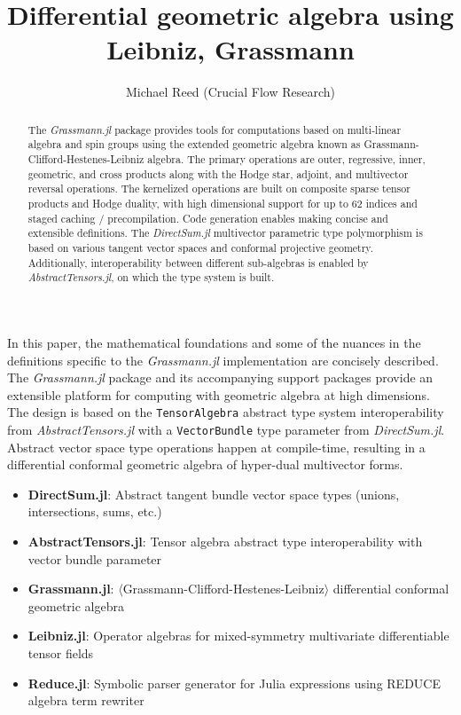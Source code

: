 \documentclass[]{article}
\author{Michael Reed (Crucial Flow Research)}
\title{Differential geometric algebra using Leibniz, Grassmann}
\begin{document}
%

\maketitle

\begin{abstract}
	The \textit{Grassmann.jl}
	package provides tools for computations based on multi-linear algebra and spin groups using the extended geometric algebra known as Grassmann-Clifford-Hestenes-Leibniz algebra.
	The primary operations are
	outer, regressive, inner, geometric, and cross products along with the Hodge star, adjoint, and multivector reversal operations. 
	The kernelized operations are built on composite sparse tensor products and Hodge duality, with high dimensional support for up to 62 indices and staged caching / precompilation. Code generation enables making concise and extensible definitions.
	The \textit{DirectSum.jl}
	multivector parametric type polymorphism is based on various tangent vector spaces and conformal projective geometry.
	Additionally, interoperability between different sub-algebras is enabled by \textit{AbstractTensors.jl},
	on which the type system is built.
\end{abstract}

In this paper, the mathematical foundations and some of the nuances in the definitions specific to the \textit{Grassmann.jl} implementation are concisely described.
The \textit{Grassmann.jl} package and its accompanying support packages provide an extensible platform for computing with geometric algebra at high dimensions. 
The design is based on the \verb`TensorAlgebra` abstract type system interoperability from \textit{AbstractTensors.jl} with a \verb`VectorBundle` type parameter from \textit{DirectSum.jl}. Abstract vector space type operations happen at compile-time, resulting in a differential conformal geometric algebra of hyper-dual multivector forms.

\begin{itemize}
	\item \textbf{DirectSum.jl}: Abstract tangent bundle vector space types (unions, intersections, sums, etc.)
	\item \textbf{AbstractTensors.jl}: Tensor algebra abstract type interoperability with vector bundle parameter	
	\item \textbf{Grassmann.jl}: $\langle$Grassmann-Clifford-Hestenes-Leibniz$\rangle$ differential conformal geometric algebra
	\item \textbf{Leibniz.jl}: Operator algebras for mixed-symmetry multivariate differentiable tensor fields
	\item \textbf{Reduce.jl}: Symbolic parser generator for Julia expressions using REDUCE algebra term rewriter
\end{itemize}
\end{document}
